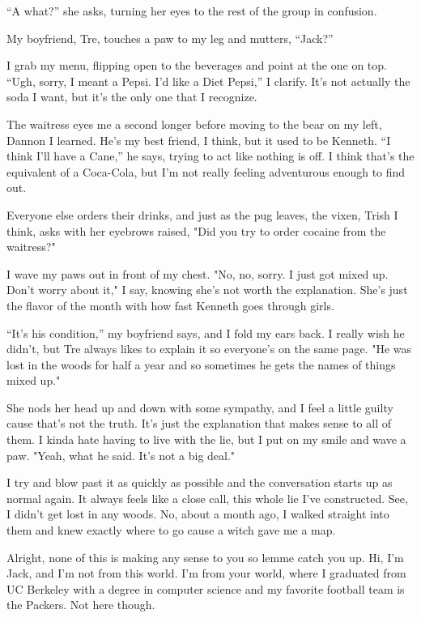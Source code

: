 ``A what?'' she asks, turning her eyes to the rest of the group in
confusion.

My boyfriend, Tre, touches a paw to my leg and mutters, ``Jack?''

I grab my menu, flipping open to the beverages and point at the one on
top. ``Ugh, sorry, I meant a Pepsi. I'd like a Diet Pepsi,'' I clarify.
It's not actually the soda I want, but it's the only one that I
recognize.

The waitress eyes me a second longer before moving to the bear on my
left, Dannon I learned. He's my best friend, I think, but it used to be
Kenneth. ``I think I'll have a Cane,'' he says, trying to act like nothing
is off. I think that's the equivalent of a Coca-Cola, but I'm not really
feeling adventurous enough to find out.

Everyone else orders their drinks, and just as the pug leaves, the
vixen, Trish I think, asks with her eyebrows raised, "Did you try to
order cocaine from the waitress?"

I wave my paws out in front of my chest. "No, no, sorry. I just got
mixed up. Don't worry about it," I say, knowing she's not worth the
explanation. She's just the flavor of the month with how fast Kenneth
goes through girls.

``It's his condition,'' my boyfriend says, and I fold my ears back. I
really wish he didn't, but Tre always likes to explain it so everyone's
on the same page. "He was lost in the woods for half a year and so
sometimes he gets the names of things mixed up."

She nods her head up and down with some sympathy, and I feel a little
guilty cause that's not the truth. It's just the explanation that makes
sense to all of them. I kinda hate having to live with the lie, but I
put on my smile and wave a paw. "Yeah, what he said. It's not a big
deal."

I try and blow past it as quickly as possible and the conversation
starts up as normal again. It always feels like a close call, this whole
lie I've constructed. See, I didn't get lost in any woods. No, about a
month ago, I walked straight into them and knew exactly where to go
cause a witch gave me a map.

Alright, none of this is making any sense to you so lemme catch you up.
Hi, I'm Jack, and I'm not from this world. I'm from your world, where I
graduated from UC Berkeley with a degree in computer science and my
favorite football team is the Packers. Not here though.

